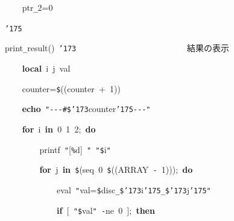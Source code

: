 \documentclass[a4paper,10pt]{article}
\def\mc{\relax}
\begin{document}
\noindent
\mbox{}{\tt\mc \ }{\tt\mc \ }{\tt\mc \ }{\tt\mc \ }ptr{\tt\_}2=0

\noindent
\mbox{}{\tt\char'175}

\noindent
\mbox{}\hfill

\noindent
\mbox{}print{\tt\_}result(){\tt\mc \ }{\tt\char'173}{\tt\mc \ }{\tt\mc \ }{\tt\mc \ }{\tt\mc \ }{\tt\mc \ }{\tt\mc \ }{\tt\mc \ }{\tt\mc \ }{\tt\mc \ }{\tt\mc \ }{\tt\mc \ }{\tt\mc \ }{\tt\mc \ }{\tt\mc \ }{\tt\mc \ }{\tt\mc \ }{\tt\mc \ }{\tt\mc \ }{\tt\mc \ }{\tt\mc \ }{\tt\mc \ }{\tt\mc \ }{\tt\mc \ }{\tt\mc \ }\rm\mc {\tt\#} \ 結果の表示 \hfill 
\tt\mc 

\noindent
\mbox{}{\tt\mc \ }{\tt\mc \ }{\tt\mc \ }{\tt\mc \ }\textbf{local}{\tt\mc \ }i{\tt\mc \ }j{\tt\mc \ }val

\noindent
\mbox{}{\tt\mc \ }{\tt\mc \ }{\tt\mc \ }{\tt\mc \ }counter={\tt\$}((counter{\tt\mc \ }+{\tt\mc \ }1))

\noindent
\mbox{}{\tt\mc \ }{\tt\mc \ }{\tt\mc \ }{\tt\mc \ }\textbf{echo}{\tt\mc \ }{\tt "}{\tt -}{\tt -}{\tt -}{\tt\#}{\tt\$}{\tt\char'173}counter{\tt\char'175}{\tt -}{\tt -}{\tt -}{\tt "}

\noindent
\mbox{}{\tt\mc \ }{\tt\mc \ }{\tt\mc \ }{\tt\mc \ }\textbf{for}{\tt\mc \ }i{\tt\mc \ }\textbf{in}{\tt\mc \ }0{\tt\mc \ }1{\tt\mc \ }2;{\tt\mc \ }\textbf{do}

\noindent
\mbox{}{\tt\mc \ }{\tt\mc \ }{\tt\mc \ }{\tt\mc \ }{\tt\mc \ }{\tt\mc \ }{\tt\mc \ }{\tt\mc \ }printf{\tt\mc \ }{\tt "}[{\tt\%}d]{\tt\mc \ }{\tt "}{\tt\mc \ }{\tt "}{\tt\$}i{\tt "}

\noindent
\mbox{}{\tt\mc \ }{\tt\mc \ }{\tt\mc \ }{\tt\mc \ }{\tt\mc \ }{\tt\mc \ }{\tt\mc \ }{\tt\mc \ }\textbf{for}{\tt\mc \ }j{\tt\mc \ }\textbf{in}{\tt\mc \ }{\tt\$}(seq{\tt\mc \ }0{\tt\mc \ }{\tt\$}((ARRAY{\tt\mc \ }{\tt -}{\tt\mc \ }1)));{\tt\mc \ }\textbf{do}

\noindent
\mbox{}{\tt\mc \ }{\tt\mc \ }{\tt\mc \ }{\tt\mc \ }{\tt\mc \ }{\tt\mc \ }{\tt\mc \ }{\tt\mc \ }{\tt\mc \ }{\tt\mc \ }{\tt\mc \ }{\tt\mc \ }eval{\tt\mc \ }{\tt "}val={\tt{}}{\tt\$}disc{\tt\_}{\tt\$}{\tt\char'173}i{\tt\char'175}{\tt\_}{\tt\$}{\tt\char'173}j{\tt\char'175}{\tt "}

\noindent
\mbox{}{\tt\mc \ }{\tt\mc \ }{\tt\mc \ }{\tt\mc \ }{\tt\mc \ }{\tt\mc \ }{\tt\mc \ }{\tt\mc \ }{\tt\mc \ }{\tt\mc \ }{\tt\mc \ }{\tt\mc \ }\textbf{if}{\tt\mc \ }[{\tt\mc \ }{\tt "}{\tt\$}val{\tt "}{\tt\mc \ }{\tt -}ne{\tt\mc \ }0{\tt\mc \ }];{\tt\mc \ }\textbf{then}
\end{document}
